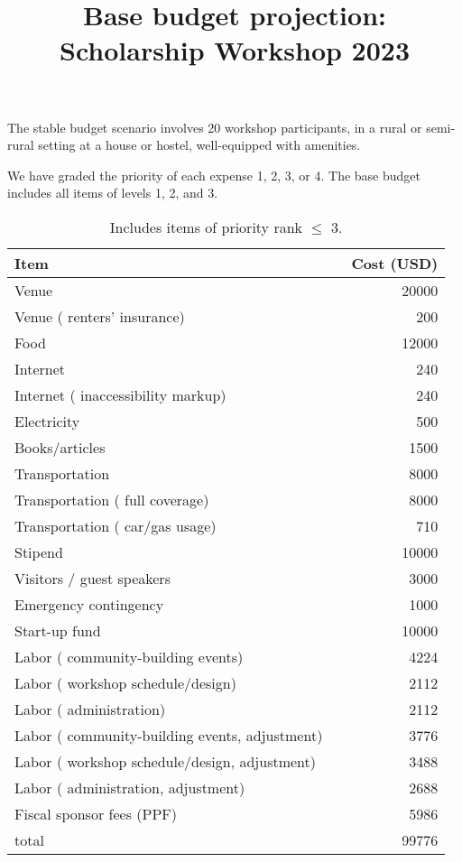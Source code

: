 \documentclass[10pt]{article}
\title{Base budget projection: Scholarship Workshop 2023}
\date{}
\begin{document}
\maketitle

\vspace{-3pc}

The stable budget scenario involves 20 workshop participants, in a rural or semi-rural setting at a house or hostel, well-equipped with amenities.

We have graded the priority of each expense 1, 2, 3, or 4. The base budget includes all items of levels 1, 2, and 3.

\begin{table}[h]
\begin{center}
\begin{tabular}{llr}
Item &  & Cost (USD) \\ \hline
Venue &  & 20000 \\
Venue ( renters' insurance) &  & 200 \\
Food &  & 12000 \\
Internet &  & 240 \\
Internet ( inaccessibility markup) &  & 240 \\
Electricity &  & 500 \\
Books/articles &  & 1500 \\
Transportation &  & 8000 \\
Transportation ( full coverage) &  & 8000 \\
Transportation ( car/gas usage) &  & 710 \\
Stipend &  & 10000 \\
Visitors / guest speakers &  & 3000 \\
Emergency contingency &  & 1000 \\
Start-up fund &  & 10000 \\
Labor ( community-building events) &  & 4224 \\
Labor ( workshop schedule/design) &  & 2112 \\
Labor ( administration) &  & 2112 \\
Labor ( community-building events, adjustment) &  & 3776 \\
Labor ( workshop schedule/design, adjustment) &  & 3488 \\
Labor ( administration, adjustment) &  & 2688 \\
Fiscal sponsor fees (PPF) &  & 5986 \\ \hline
total &  & 99776
\end{tabular}
\end{center}
\caption{Includes items of priority rank $\leq$ 3.}\label{main}
\end{table}
\end{document}
